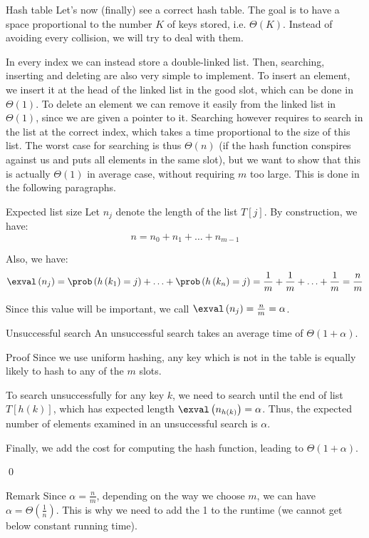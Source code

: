 \documentclass[a4paper]{article}
\begin{document}
\begin{parag}{Hash table}
    Let's now (finally) see a correct hash table. The goal is to have a space proportional to the number $K$ of keys stored, i.e. $\Theta\left(K\right)$. Instead of avoiding every collision, we will try to deal with them.

    In every index we can instead store a double-linked list. Then, searching, inserting and deleting are also very simple to implement. To insert an element, we insert it at the head of the linked list in the good slot, which can be done in $\Theta\left(1\right)$. To delete an element we can remove it easily from the linked list in $\Theta\left(1\right)$, since we are given a pointer to it. Searching however requires to search in the list at the correct index, which takes a time proportional to the size of this list. The worst case for searching is thus $\Theta\left(n\right)$ (if the hash function conspires against us and puts all elements in the same slot), but we want to show that this is actually $\Theta\left(1\right)$ in average case, without requiring $m$ too large. This is done in the following paragraphs.
\end{parag}

\begin{parag}{Expected list size}
    Let $n_j$ denote the length of the list $T\left[j\right]$. By construction, we have: 
    \[n = n_0 + n_1 + \ldots + n_{m-1}\]
    
    Also, we have: 
    \[\exval\left(n_j\right) = \prob\left(h\left(k_1\right) = j\right) + \ldots + \prob\left(h\left(k_n\right) = j\right) = \frac{1}{m} + \frac{1}{m} + \ldots + \frac{1}{m} = \frac{n}{m}\]

    Since this value will be important, we call $\exval\left(n_j\right) = \frac{n}{m} = \alpha$.
\end{parag}

\begin{parag}{Unsuccessful search}
    An unsuccessful search takes an average time  of $\Theta\left(1 + \alpha\right)$.

    \begin{subparag}{Proof}
        Since we use uniform hashing, any key which is not in the table is equally likely to hash to any of the $m$ slots.

        To search unsuccessfully for any key $k$, we need to search until the end of list $T\left[h\left(k\right)\right]$, which has expected length $\exval\left(n_{h\left(k\right)}\right) = \alpha$. Thus, the expected number of elements examined in an unsuccessful search is $\alpha$.

        Finally, we add the cost for computing the hash function, leading to $\Theta\left(1 + \alpha\right)$.

        \qed
    \end{subparag}
 
    \begin{subparag}{Remark}
        Since $\alpha = \frac{n}{m}$, depending on the way we choose $m$, we can have $\alpha = \Theta\left(\frac{1}{n}\right)$. This is why we need to add the 1 to the runtime (we cannot get below constant running time).
    \end{subparag}
\end{parag}
\end{document}
